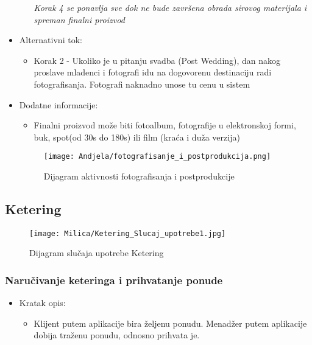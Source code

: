 \documentclass[a4paper]{article}
\begin{document}
\begin{itemize}
\begin{enumerate}
            \textit{Korak 4 se ponavlja sve dok ne bude završena obrada sirovog materijala i spreman finalni proizvod}
        \end{enumerate}
    \item Alternativni tok:
        \begin{itemize}
            \item Korak 2 - Ukoliko je u pitanju svadba (Post Wedding), dan nakog proslave mladenci i fotografi idu na dogovorenu destinaciju radi fotografisanja. Fotografi naknadno unose tu cenu u sistem
    \end{itemize}
    \item Dodatne informacije:
        \begin{itemize}
            \item Finalni proizvod može biti fotoalbum, fotografije u elektronskoj formi, buk, spot(od 30s do 180s) ili film (kraća i duža verzija)
        \end{itemize}
    
    \begin{figure}[H]
    \centering
\texttt{[image: Andjela/fotografisanje\_i\_postprodukcija.png]}
    \caption{Dijagram aktivnosti fotografisanja i postprodukcije}
    \label{fig:RegistracijaZ}
\end{figure}
    
        
\end{itemize}




\subsection{Ketering}

  
\begin{figure}[H]
\centering
\texttt{[image: Milica/Ketering\_Slucaj\_upotrebe1.jpg]}
\caption{Dijagram slučaja upotrebe Ketering}
\label{fig:Ketering}
\end{figure}

\subsubsection{Naručivanje keteringa i prihvatanje ponude}
\begin{itemize}
    \item Kratak opis:
    \begin{itemize}
 
        \item Klijent putem aplikacije bira željenu ponudu. Menadžer putem aplikacije dobija traženu ponudu, odnosno prihvata je.
    \end{itemize}
    
    
\end{itemize}
\end{document}
